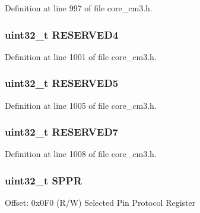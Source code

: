 Definition at line 997 of file core\+\_\+cm3.\+h.

\subsubsection[{\texorpdfstring{R\+E\+S\+E\+R\+V\+E\+D4}{RESERVED4}}]{\setlength{\rightskip}{0pt plus 5cm}uint32\+\_\+t R\+E\+S\+E\+R\+V\+E\+D4}\hypertarget{struct_t_p_i___type_a1defe18fe95571e383d754b13d3f6c51}{}\label{struct_t_p_i___type_a1defe18fe95571e383d754b13d3f6c51}


Definition at line 1001 of file core\+\_\+cm3.\+h.

\subsubsection[{\texorpdfstring{R\+E\+S\+E\+R\+V\+E\+D5}{RESERVED5}}]{\setlength{\rightskip}{0pt plus 5cm}uint32\+\_\+t R\+E\+S\+E\+R\+V\+E\+D5}\hypertarget{struct_t_p_i___type_ae024db200dd6038b38de69abd513f40c}{}\label{struct_t_p_i___type_ae024db200dd6038b38de69abd513f40c}


Definition at line 1005 of file core\+\_\+cm3.\+h.

\subsubsection[{\texorpdfstring{R\+E\+S\+E\+R\+V\+E\+D7}{RESERVED7}}]{\setlength{\rightskip}{0pt plus 5cm}uint32\+\_\+t R\+E\+S\+E\+R\+V\+E\+D7}\hypertarget{struct_t_p_i___type_a49f51f1c090eb2cda74363bbfc3b385b}{}\label{struct_t_p_i___type_a49f51f1c090eb2cda74363bbfc3b385b}


Definition at line 1008 of file core\+\_\+cm3.\+h.

\subsubsection[{\texorpdfstring{S\+P\+PR}{SPPR}}]{ uint32\+\_\+t S\+P\+PR}\hypertarget{struct_t_p_i___type_ae9673e1acb75a46ed9852fd7a557cb7d}{}\label{struct_t_p_i___type_ae9673e1acb75a46ed9852fd7a557cb7d}
Offset\+: 0x0\+F0 (R/W) Selected Pin Protocol Register 

